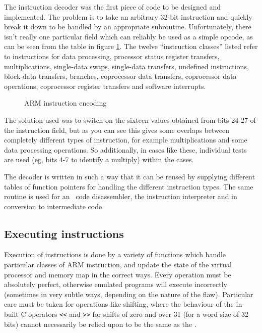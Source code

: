 The instruction decoder was the first piece of code to be designed and implemented. The problem is to take an arbitrary 32-bit instruction and quickly break it down to be handled by an appropriate subroutine. Unfortunately, there isn't really one particular field which can reliably be used as a simple opcode, as can be seen from the table in figure \ref{armtable}. The twelve ``instruction classes'' listed refer to instructions for data processing, processor status register transfers, multiplications, single-data swaps, single-data transfers, undefined instructions, block-data transfers, branches, coprocessor data transfers, coprocessor data operations, coprocessor register transfers and software interrupts.

\begin{figure}[tbh]

\armtab

\caption{\label{armtable}ARM instruction encoding}
\end{figure}

The solution used was to switch on the sixteen values obtained from bits 24-27 of the instruction field, but as you can see this gives some overlaps between completely different types of instruction, for example multiplications and some data processing operations. So additionally, in cases like these, individual tests are used (eg, bits 4-7 to identify a multiply) within the cases.

The decoder is written in such a way that it can be reused by supplying different tables of function pointers for handling the different instruction types. The same routine is used for an \arm\ code disassembler, the instruction interpreter and in conversion to intermediate code.

\subsection{Executing instructions}

Execution of instructions is done by a variety of functions which handle particular classes of ARM instruction, and update the state of the virtual processor and memory map in the correct ways. Every operation must be absolutely perfect, otherwise emulated programs will execute incorrectly (sometimes in very subtle ways, depending on the nature of the flaw). Particular care must be taken for operations like shifting, where the behaviour of the in-built C operators {\tt <<} and {\tt >>} for shifts of zero and over 31 (for a word size of 32 bits) cannot necessarily be relied upon to be the same as the \arm.

